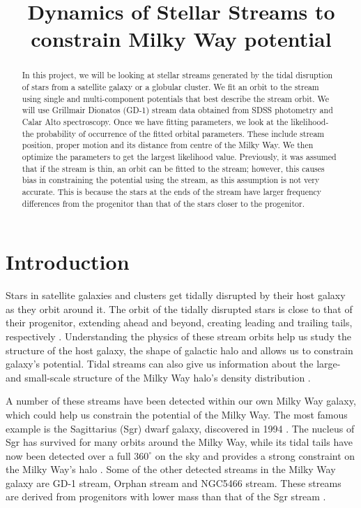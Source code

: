 \documentclass[preprint]{aastex}
\title{Dynamics of Stellar Streams to constrain Milky Way potential}
\affil{\small {Anita Bahmanyar}}
\affil{\small {Supervised by: Prof. Jo Bovy}}
\date{}
\begin{document}
\begin{abstract}
In this project, we will be looking at stellar streams generated by the tidal disruption of stars from a satellite galaxy or a globular cluster.
We fit an orbit to the stream using single and multi-component potentials that best describe the stream orbit. We will use Grillmair Dionatos (GD-1) stream data obtained from SDSS photometry and Calar Alto spectroscopy. Once we have fitting parameters, we look at the likelihood- the probability of occurrence of the fitted orbital parameters. These include stream position, proper motion and its distance from centre of the Milky Way. We then optimize the parameters to get the largest likelihood value. Previously, it was assumed that if the stream is thin, an orbit can be fitted to the stream; however, this causes bias in constraining the potential using the stream, as this assumption is not  very accurate. This is because the stars at the ends of the stream have larger frequency differences from the progenitor than that of the stars closer to the progenitor.
\end{abstract}

\maketitle

\section{Introduction}
Stars in satellite galaxies and clusters get tidally disrupted by their host galaxy as they orbit around it. The orbit of the tidally disrupted stars is close to that of their progenitor, extending ahead and beyond, creating leading and trailing tails, respectively \citep{Bowden2015}. Understanding the physics of these stream orbits help us study the structure of the host galaxy, the shape of galactic halo and allows us to constrain galaxy's potential. Tidal streams can also give us information about the large- and small-scale structure of the Milky Way halo's density distribution \citep{Bovy2014}.

A number of these streams have been detected within our own Milky Way galaxy, which could help us constrain the potential of the Milky Way. The most famous example is the Sagittarius (Sgr) dwarf galaxy, discovered in 1994 \citep{Ibata1994}. The nucleus of Sgr has survived for many orbits around the Milky Way, while its tidal tails have now been detected over a full $360^{\circ}$ on the sky and provides a strong constraint on the Milky Way's halo \citep{Fellhauer2006}. 
Some of the other detected streams in the Milky Way galaxy are GD-1 stream, Orphan stream and NGC5466 stream. 
These streams are derived from progenitors with lower mass than that of the Sgr stream \citep{Bowden2015}.
\end{document}
